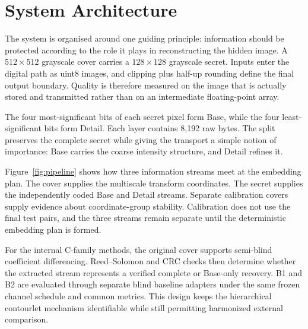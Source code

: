\section{System Architecture}

The system is organised around one guiding principle: information should be protected according to the role it plays in reconstructing the hidden image. A \(512\times512\) grayscale cover carries a \(128\times128\) grayscale secret. Inputs enter the digital path as uint8 images, and clipping plus half-up rounding define the final output boundary. Quality is therefore measured on the image that is actually stored and transmitted rather than on an intermediate floating-point array.

The four most-significant bits of each secret pixel form Base, while the four least-significant bits form Detail. Each layer contains 8,192 raw bytes. The split preserves the complete secret while giving the transport a simple notion of importance: Base carries the coarse intensity structure, and Detail refines it.

Figure~\ref{fig:pipeline} shows how three information streams meet at the embedding plan. The cover supplies the multiscale transform coordinates. The secret supplies the independently coded Base and Detail streams. Separate calibration covers supply evidence about coordinate-group stability. Calibration does not use the final test pairs, and the three streams remain separate until the deterministic embedding plan is formed.

For the internal C-family methods, the original cover supports semi-blind coefficient differencing. Reed--Solomon and CRC checks then determine whether the extracted stream represents a verified complete or Base-only recovery. B1 and B2 are evaluated through separate blind baseline adapters under the same frozen channel schedule and common metrics. This design keeps the hierarchical contourlet mechanism identifiable while still permitting harmonized external comparison.

